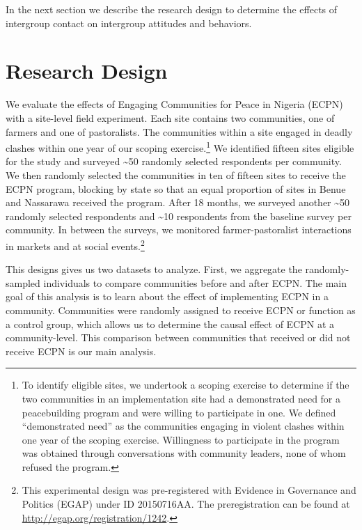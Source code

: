 \documentclass[11pt]{article}
\begin{document}
In the next section we describe the research design to determine the
effects of intergroup contact on intergroup attitudes and behaviors.

\hypertarget{research-design}{%
\section{Research Design}\label{research-design}}

We evaluate the effects of Engaging Communities for Peace in Nigeria
(ECPN) with a site-level field experiment. Each site contains two
communities, one of farmers and one of pastoralists. The communities
within a site engaged in deadly clashes within one year of our scoping
exercise.\footnote{To identify eligible sites, we undertook a scoping
  exercise to determine if the two communities in an implementation site
  had a demonstrated need for a peacebuilding program and were willing
  to participate in one. We defined ``demonstrated need'' as the
  communities engaging in violent clashes within one year of the scoping
  exercise. Willingness to participate in the program was obtained
  through conversations with community leaders, none of whom refused the
  program.} We identified fifteen sites eligible for the study and
surveyed \textasciitilde{}50 randomly selected respondents per
community. We then randomly selected the communities in ten of fifteen
sites to receive the ECPN program, blocking by state so that an equal
proportion of sites in Benue and Nassarawa received the program. After
18 months, we surveyed another \textasciitilde{}50 randomly selected
respondents and \textasciitilde{}10 respondents from the baseline survey
per community. In between the surveys, we monitored farmer-pastoralist
interactions in markets and at social events.\footnote{This experimental
  design was pre-registered with Evidence in Governance and Politics
  (EGAP) under ID 20150716AA. The preregistration can be found at
  \url{http://egap.org/registration/1242}.}

This designs gives us two datasets to analyze. First, we aggregate the
randomly-sampled individuals to compare communities before and after
ECPN. The main goal of this analysis is to learn about the effect of
implementing ECPN in a community. Communities were randomly assigned to
receive ECPN or function as a control group, which allows us to
determine the causal effect of ECPN at a community-level. This
comparison between communities that received or did not receive ECPN is
our main analysis.
\end{document}

